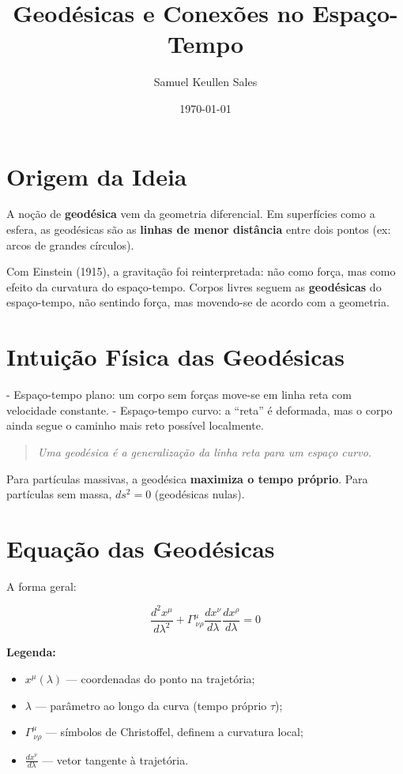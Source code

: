 \documentclass[a4paper,12pt]{article}
\title{\textbf{Geodésicas e Conexões no Espaço-Tempo}}
\author{Samuel Keullen Sales}
\date{\today}
\begin{document}
\maketitle

\section*{Origem da Ideia}

A noção de \textbf{geodésica} vem da geometria diferencial.  
Em superfícies como a esfera, as geodésicas são as \textbf{linhas de menor distância} entre dois pontos (ex: arcos de grandes círculos).  

Com Einstein (1915), a gravitação foi reinterpretada: não como força, mas como efeito da curvatura do espaço-tempo.  
Corpos livres seguem as \textbf{geodésicas} do espaço-tempo, não sentindo força, mas movendo-se de acordo com a geometria.

\section*{Intuição Física das Geodésicas}

- Espaço-tempo plano: um corpo sem forças move-se em linha reta com velocidade constante.  
- Espaço-tempo curvo: a “reta” é deformada, mas o corpo ainda segue o caminho mais reto possível localmente.

\begin{quote}
\textit{Uma geodésica é a generalização da linha reta para um espaço curvo.}
\end{quote}

Para partículas massivas, a geodésica \textbf{maximiza o tempo próprio}.  
Para partículas sem massa, $ds^2=0$ (geodésicas nulas).

\section*{Equação das Geodésicas}

A forma geral:

\begin{equation}
\frac{d^2 x^\mu}{d\lambda^2} + \Gamma^{\mu}_{\ \nu\rho} 
\frac{d x^\nu}{d\lambda} \frac{d x^\rho}{d\lambda} = 0
\end{equation}

\textbf{Legenda:}
\begin{itemize}
    \item $x^\mu(\lambda)$ — coordenadas do ponto na trajetória;
    \item $\lambda$ — parâmetro ao longo da curva (tempo próprio $\tau$);
    \item $\Gamma^{\mu}_{\ \nu\rho}$ — símbolos de Christoffel, definem a curvatura local;
    \item $\frac{dx^\nu}{d\lambda}$ — vetor tangente à trajetória.
\end{itemize}
\end{document}
